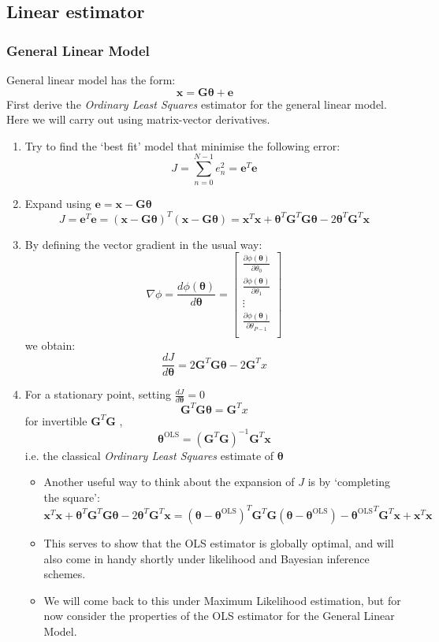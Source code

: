 \documentclass[12pt]{article}
\newcommand{\titc}[1]{\textit{\textcolor{blue1}{#1}}}
\newcommand{\dydx}[2]{\frac{\partial{#1}}{\partial{#2}}}
\newcommand{\OLS}{\textrm{OLS}}
\newcommand{\thetab}{\boldsymbol{\theta}}
\newcommand{\phtheta}{\phi(\thetab)}
\newcommand{\thetaols}{\thetab^\OLS}
\begin{document}
\subsection{Linear estimator}
\subsubsection{General Linear Model}
General linear model has the form:
\[
    \mathbf{x = G \thetab + e}
\]
First derive the \titc{Ordinary Least Squares} estimator for the general linear model. Here we will carry out using matrix-vector derivatives.
\begin{enumerate}
    
    \item Try to find the `best fit' model that minimise the following error:
    \[
    J = \sum_{n=0}^{N-1}e^2_n = \mathbf{e}^T\mathbf{e}
    \]
    \item Expand using $\mathbf{e = x - G\theta}$
    \[
    J = \mathbf{e}^T\mathbf{e} = (\mathbf{x - G\thetab})^T(\mathbf{x - G\thetab}) = \mathbf{x}^T\mathbf{x} + \thetab^T\mathbf{G}^T\mathbf{G}\thetab - 2\thetab^T\mathbf{G}^T\mathbf{x}
    \]
    \item By defining the vector gradient in the usual way:
    \[
    \nabla\phi = \frac{d\phtheta}{d\thetab} = \begin{bmatrix}
    \dydx{\phtheta}{\theta_0} \\
    \dydx{\phtheta}{\theta_1} \\
    \vdots \\
    \dydx{\phtheta}{\theta_{P-1}} \\
    \end{bmatrix}
    \]
    we obtain:
    \[
    \frac{dJ}{d\thetab} = 2\mathbf{G}^T\mathbf{G}\thetab - 2\mathbf{G}^T x
    \]
    \item For a stationary point, setting $\frac{dJ}{d\thetab} = 0$
    \[
    \mathbf{G}^T\mathbf{G}\thetab = \mathbf{G}^T x
    \]
    for invertible $\mathbf{G}^T\mathbf{G}$ ,
    \[
    \thetaols = (\mathbf{G}^T\mathbf{G})^{-1}\mathbf{G}^T\mathbf{x}
    \]
    i.e. the classical \textit{Ordinary Least Squares} estimate of $\thetab$
    \begin{itemize}
        \item Another useful way to think about the expansion of $J$ is by `completing the square':
        \[
        \mathbf{x}^T\mathbf{x} + \thetab^T\mathbf{G}^T\mathbf{G}\thetab - 2\thetab^T\mathbf{G}^T\mathbf{x} = (\thetab - \thetaols)^T \mathbf{G}^T\mathbf{G} (\thetab - \thetaols) - {\thetaols}^T \mathbf{G}^T\mathbf{x} + \mathbf{x}^T\mathbf{x}
        \]
        \item This serves to show that the OLS estimator is globally optimal, and will also come in handy shortly under likelihood and Bayesian inference schemes.
        \item We will come back to this under Maximum Likelihood estimation, but for now consider the properties of the OLS estimator for the General Linear Model.
    \end{itemize}
\end{enumerate}
\end{document}
